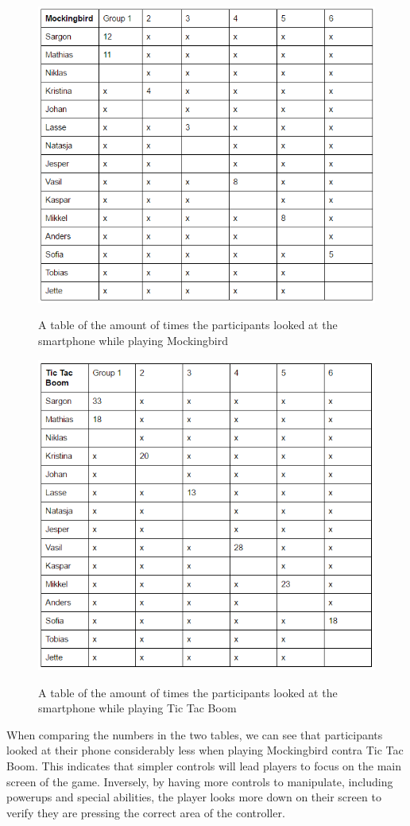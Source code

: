 \begin{figure}
\centering
\includegraphics[width=\textwidth]{figures/birdTable} \label{fig:birdTable}
\caption{A table of the amount of times the participants looked at the smartphone while playing Mockingbird}
\end{figure}

\begin{figure}
\centering
\includegraphics[width=\textwidth]{figures/TTBtable} \label{fig:TTBtable}
\caption{A table of the amount of times the participants looked at the smartphone while playing Tic Tac Boom}
\end{figure}

When comparing the numbers in the two tables, we can see that participants looked at their phone considerably less when playing Mockingbird contra Tic Tac Boom. This indicates that simpler controls will lead players to focus on the main screen of the game. Inversely, by having more controls to manipulate, including powerups and special abilities, the player looks more down on their screen to verify they are pressing the correct area of the controller. 
